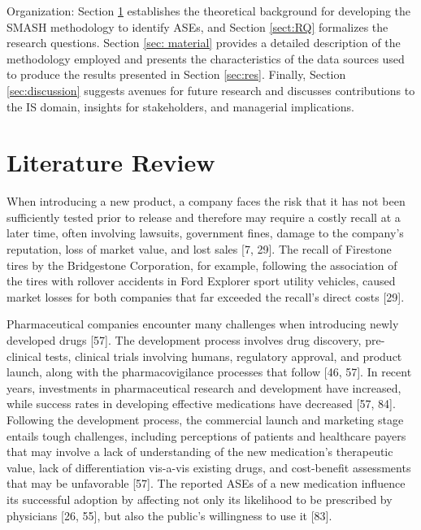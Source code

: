 \documentclass[referee,bst/sn-basic]{sn-jnl}%
\begin{document}
Organization:
Section \ref{sec:LR} establishes the theoretical background for developing the SMASH methodology to identify ASEs, and  
Section \ref{sect:RQ} formalizes the research questions. 
Section \ref{sec: material} provides a detailed description of the methodology employed and presents the characteristics of the data sources used to produce the results presented in Section \ref{sec:res}.
Finally, Section \ref{sec:discussion} suggests avenues for future research and discusses contributions to the IS domain, insights for stakeholders, and managerial implications. 


\section{Literature Review}
\label{sec:LR}

When introducing a new product, a company faces the risk that it has not been sufficiently tested prior to release and therefore may require a costly recall at a later time, often involving lawsuits, government fines, damage to the company’s reputation, loss of market value, and lost sales [7, 29]. 
The recall of Firestone tires by the Bridgestone Corporation, for example, following the association of the tires with rollover accidents in Ford Explorer sport utility vehicles, caused market losses for both companies that far exceeded the recall’s direct costs [29]. 

Pharmaceutical companies encounter many challenges when introducing newly developed drugs [57]. 
The development process involves drug discovery, pre-clinical tests, clinical trials involving humans, regulatory approval, and product launch, along with the pharmacovigilance processes that follow [46, 57]. 
In recent years, investments in pharmaceutical research and development have increased, while success rates in developing effective  medications have decreased [57, 84]. 
Following the development process, the commercial launch and marketing stage entails tough challenges, including perceptions of patients and healthcare payers that may involve a lack of understanding of the new medication’s therapeutic value, lack of differentiation vis-a-vis existing drugs, and cost-benefit assessments that may be unfavorable [57]. 
The reported ASEs of a new medication influence its successful adoption by affecting not only its likelihood to be prescribed by physicians [26, 55], 
but also the public’s willingness to use it [83]. 
\end{document}

